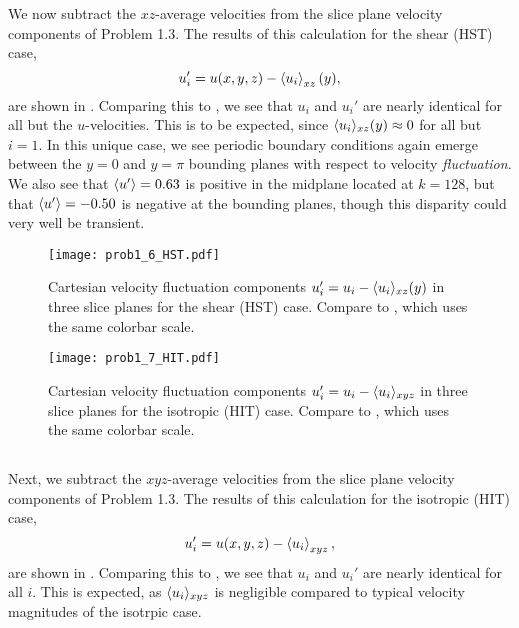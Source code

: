 \documentclass[11pt]{article}
\begin{document}
We now subtract the $xz$-average velocities from the slice plane velocity components of Problem 1.3. The results of this calculation for the shear (HST) case,
\begin{equation}
u_i' = u(x,y,z) - \left< u_i \right>_{xz}(y)
,
\end{equation}
are shown in . Comparing this to , we see that $u_i$ and $u_i'$ are nearly identical for all but the $u$-velocities. This is to be expected, since $\langle u_i \rangle_{xz}(y) \approx 0$ for all but $i=1$. In this unique case, we see periodic boundary conditions again emerge between the $y=0$ and $y=\pi$ bounding planes with respect to velocity \emph{fluctuation}. We also see that $\langle u' \rangle=0.63$ is positive in the midplane located at $k=128$, but that $\langle u' \rangle=-0.50$ is negative at the bounding planes, though this disparity could very well be transient.

\begin{figure}[h!]
\centering
\texttt{[image: prob1\_6\_HST.pdf]}
\\[6pt]
\caption{Cartesian velocity fluctuation components $u_i' = u_i - \langle u_i \rangle_{xz}(y)$ in three slice planes for the shear (HST) case. Compare to , which uses the same colorbar scale.}
\label{fig:prob_1_6_slices}
\end{figure}

\begin{figure}[h!]
\centering
\texttt{[image: prob1\_7\_HIT.pdf]}
\\[6pt]
\caption{Cartesian velocity fluctuation components $u_i' = u_i - \langle u_i \rangle_{xyz}$ in three slice planes for the isotropic (HIT) case. Compare to , which uses the same colorbar scale.}
\label{fig:prob_1_7_slices}
\end{figure}

\subsection{}

Next, we subtract the $xyz$-average velocities from the slice plane velocity components of Problem 1.3. The results of this calculation for the isotropic (HIT) case,
\begin{equation}
u_i' = u(x,y,z) - \left< u_i \right>_{xyz}
,
\end{equation}
are shown in . Comparing this to , we see that $u_i$ and $u_i'$ are nearly identical for all $i$. This is expected, as $\langle u_i \rangle_{xyz}$ is negligible compared to typical velocity magnitudes of the isotrpic case.
\end{document}
